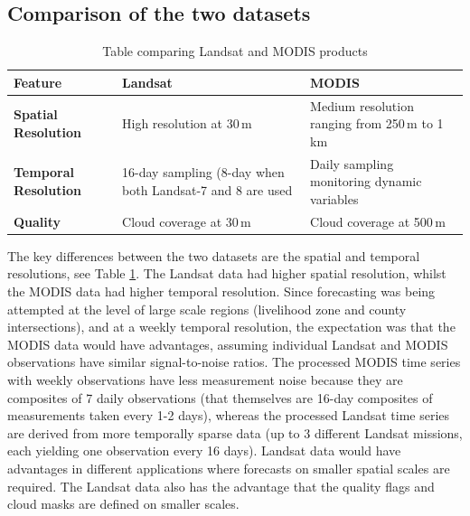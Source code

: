 \documentclass[review]{elsarticle}
\begin{document}
\subsection{Comparison of the two datasets} 

\begin{table}[!hb]
	\small
	\caption{Table comparing Landsat and MODIS products}\label{tab:sm1}
	\label{tab:comp}
	\centering
	\begin{tabular}{p{2cm}p{4cm}p{4cm}}
		\toprule
		\textbf{Feature}	& \textbf{Landsat} & \textbf{MODIS}\\
		\midrule
		\textbf{Spatial \newline Resolution} & 	High resolution at 30\,m 	&   Medium resolution ranging from 250\,m to 1\,km \\
		\textbf{Temporal \newline Resolution}	&  16-day sampling (8-day when both Landsat-7 and 8 are used	&   Daily sampling  monitoring dynamic variables  \\ 
		\textbf{Quality} &Cloud coverage at 30\,m & Cloud coverage at 500\,m \\
		
		\bottomrule
	\end{tabular}
\end{table}

The key differences between the two datasets are the spatial and temporal resolutions, see Table \ref{tab:comp}. The Landsat data had higher spatial resolution, whilst the MODIS data had higher temporal resolution. Since forecasting was being attempted at the level of large scale regions (livelihood zone and county intersections), and at a weekly temporal resolution, the expectation was that the MODIS data would have advantages,  assuming individual Landsat and MODIS observations have similar signal-to-noise ratios. The processed MODIS time series with weekly observations have less measurement noise because they are composites of 7 daily observations (that themselves are 16-day composites of measurements taken every 1-2 days), whereas the processed Landsat time series are derived from more temporally sparse data (up to 3 different Landsat missions, each yielding one observation every 16 days). Landsat data would have advantages in different applications where forecasts on smaller spatial scales are required. The Landsat data also has the advantage that the quality flags and cloud masks are defined on smaller scales.    
\end{document}
